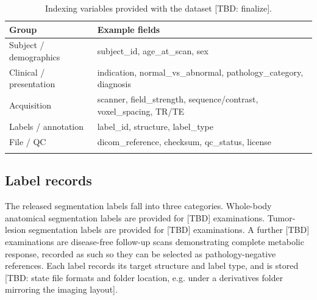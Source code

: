 \begin{table}[h]
\caption{Indexing variables provided with the dataset [TBD: finalize].}\label{tab:vars}
\begin{tabular}{@{}ll@{}}
\toprule
Group & Example fields \\
\midrule
Subject / demographics & subject\_id, age\_at\_scan, sex \\
Clinical / presentation & indication, normal\_vs\_abnormal, pathology\_category, diagnosis \\
Acquisition & scanner, field\_strength, sequence/contrast, voxel\_spacing, TR/TE \\
Labels / annotation & label\_id, structure, label\_type \\
File / QC & dicom\_reference, checksum, qc\_status, license \\
\botrule
\end{tabular}
\end{table}

\subsection*{Label records}\label{subsec:labels}
The released segmentation labels fall into three categories.
Whole-body anatomical segmentation labels are provided for [TBD] examinations.
Tumor-lesion segmentation labels are provided for [TBD] examinations.
A further [TBD] examinations are disease-free follow-up scans demonstrating complete metabolic response, recorded as such so they can be selected as pathology-negative references.
Each label records its target structure and label type, and is stored [TBD: state file formats and folder location, e.g. under a derivatives folder mirroring the imaging layout].
